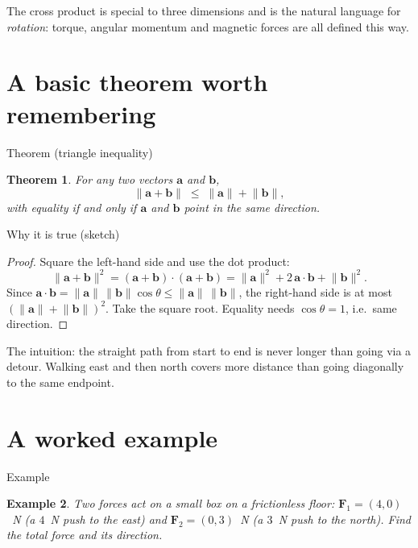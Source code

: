 \documentclass[11pt,a4paper]{article}
\newtheorem{theorem}{Theorem}[section]
\newtheorem{example}[theorem]{Example}
\newcommand{\vect}[1]{\boldsymbol{#1}}
\begin{document}
The cross product is special to three dimensions and is the natural language
for \emph{rotation}: torque, angular momentum and magnetic forces are all defined this way.

\section{A basic theorem worth remembering}

\begin{mathblock}{Theorem (triangle inequality)}
\begin{theorem}
For any two vectors $\vect{a}$ and $\vect{b}$,
\[
  \lVert \vect{a} + \vect{b} \rVert \;\le\; \lVert \vect{a} \rVert + \lVert \vect{b} \rVert,
\]
with equality if and only if $\vect{a}$ and $\vect{b}$ point in the same direction.
\end{theorem}
\end{mathblock}

\begin{mathblock}{Why it is true (sketch)}
\begin{proof}
Square the left-hand side and use the dot product:
\[
  \lVert\vect{a}+\vect{b}\rVert^2
  = (\vect{a}+\vect{b})\cdot(\vect{a}+\vect{b})
  = \lVert\vect{a}\rVert^2 + 2\,\vect{a}\cdot\vect{b} + \lVert\vect{b}\rVert^2.
\]
Since $\vect{a}\cdot\vect{b} = \lVert\vect{a}\rVert\,\lVert\vect{b}\rVert\cos\theta
\le \lVert\vect{a}\rVert\,\lVert\vect{b}\rVert$, the right-hand side is at most
$(\lVert\vect{a}\rVert+\lVert\vect{b}\rVert)^2$. Take the square root.
Equality needs $\cos\theta = 1$, i.e.\ same direction.
\end{proof}
\end{mathblock}

The intuition: the straight path from start to end is never longer than going via a detour.
Walking east and then north covers more distance than going diagonally to the same endpoint.

\section{A worked example}

\begin{mathblock}{Example}
\begin{example}
Two forces act on a small box on a frictionless floor:
$\vect{F}_1 = (4, 0)$~N (a $4$~N push to the east)
and $\vect{F}_2 = (0, 3)$~N (a $3$~N push to the north).
Find the total force and its direction.
\end{example}
\end{mathblock}
\end{document}
